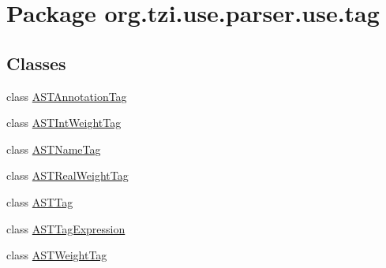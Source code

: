 \hypertarget{namespaceorg_1_1tzi_1_1use_1_1parser_1_1use_1_1tag}{\section{Package org.\-tzi.\-use.\-parser.\-use.\-tag}
\label{namespaceorg_1_1tzi_1_1use_1_1parser_1_1use_1_1tag}
}
\subsection*{Classes}
\begin{DoxyCompactItemize}
\item 
class \hyperlink{classorg_1_1tzi_1_1use_1_1parser_1_1use_1_1tag_1_1_a_s_t_annotation_tag}{A\-S\-T\-Annotation\-Tag}
\item 
class \hyperlink{classorg_1_1tzi_1_1use_1_1parser_1_1use_1_1tag_1_1_a_s_t_int_weight_tag}{A\-S\-T\-Int\-Weight\-Tag}
\item 
class \hyperlink{classorg_1_1tzi_1_1use_1_1parser_1_1use_1_1tag_1_1_a_s_t_name_tag}{A\-S\-T\-Name\-Tag}
\item 
class \hyperlink{classorg_1_1tzi_1_1use_1_1parser_1_1use_1_1tag_1_1_a_s_t_real_weight_tag}{A\-S\-T\-Real\-Weight\-Tag}
\item 
class \hyperlink{classorg_1_1tzi_1_1use_1_1parser_1_1use_1_1tag_1_1_a_s_t_tag}{A\-S\-T\-Tag}
\item 
class \hyperlink{classorg_1_1tzi_1_1use_1_1parser_1_1use_1_1tag_1_1_a_s_t_tag_expression}{A\-S\-T\-Tag\-Expression}
\item 
class \hyperlink{classorg_1_1tzi_1_1use_1_1parser_1_1use_1_1tag_1_1_a_s_t_weight_tag}{A\-S\-T\-Weight\-Tag}
\end{DoxyCompactItemize}

